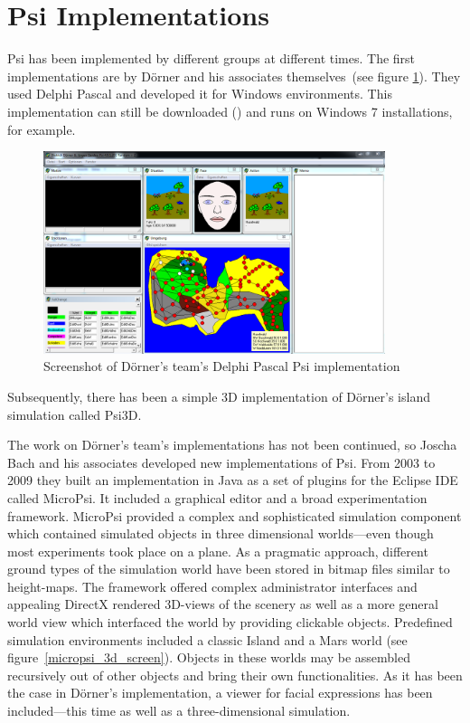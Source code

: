     \section{Psi Implementations}
Psi has been implemented by different groups at different times. The first implementations are by Dörner and his associates themselves~(see figure \ref{psi_screen}). They used Delphi Pascal and developed it for Windows environments. This implementation can still be downloaded (\cite{PsiDownload}) and runs on Windows 7 installations, for example. 

\begin{figure}[h]
  \centering
    \includegraphics[width=10cm]{graphics/psi_screen1}
  \caption{Screenshot of Dörner's team's Delphi Pascal Psi implementation}
  \label{psi_screen}
\end{figure}


Subsequently, there has been a simple 3D implementation of Dörner's island simulation called Psi3D.


The work on Dörner's team's implementations has not been continued, so Joscha Bach and his associates developed new implementations of Psi. From 2003 to 2009 they built an implementation in Java as a set of plugins for the Eclipse IDE called MicroPsi. It included a graphical editor and a broad experimentation framework. MicroPsi provided a complex and sophisticated simulation component which contained simulated objects in three dimensional worlds---even though most experiments took place on a plane. As a pragmatic approach, different ground types of the simulation world have been stored in bitmap files similar to height-maps. The framework offered complex administrator interfaces and appealing DirectX rendered 3D-views of the scenery as well as a more general world view which interfaced the world by providing clickable objects. Predefined simulation environments included a classic Island and a Mars world (see figure~\ref{micropsi_3d_screen}). Objects in these worlds may be assembled recursively out of other objects and bring their own functionalities. As it has been the case in Dörner's implementation, a viewer for facial expressions has been included---this time as well as a three-dimensional simulation.~\cite{Bach:2009:PSI:1611304}


